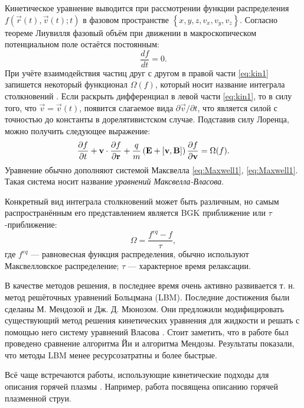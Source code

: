 Кинетическое уравнение выводится при рассмотрении функции распределения $f \left( \vec{r} (t), \vec{v} (t); t \right)$ в фазовом пространстве $\left\{ x,y,z,v_x,v_y,v_z \right\}$. Согласно теореме Лиувилля фазовый объём при движении в макроскопическом потенциальном поле остаётся постоянным:
\begin{equation}
\frac{d f}{dt} = 0.
\label{eq:kin1}
\end{equation}
При учёте взаимодействия частиц друг с другом в правой части \eqref{eq:kin1} запишется некоторый функционал $\Omega (f)$, который носит название интеграла столкновений \cite{chang1992unified}. Если раскрыть дифференциал в левой части \eqref{eq:kin1}, то в силу того, что $\vec{v} = \vec{v}(t)$, появится слагаемое вида $\partial \vec{v} / \partial t$, что является силой с точностью до константы в дорелятивистском случае. Подставив силу Лоренца, можно получить следующее выражение:
\begin{eqnarray}
\frac{\partial {f}}{\partial {t}} + \mathbf{v} \cdot \frac{\partial {f}}{\partial {\mathbf{r}}} + \frac{q}{m} \left( \mathbf{E} + \left[ \mathbf{{v}},\mathbf{{B}} \right] \right) \frac{\partial {f}}{\partial {\mathbf{v}}} = \Omega (f).
\label{eq:kinetic2}
\end{eqnarray}
Уравнение обычно дополняют системой Максвелла \eqref{eq:Maxwell1}, \eqref{eq:Maxwell1}. Такая система носит название \textit{уравнений Максвелла-Власова}.

Конкретный вид интеграла столкновений может быть различным, но самым распространённым его представлением является BGK приближение или $\tau$-приближение:
\begin{equation}
\Omega = \frac{f^{eq} - f}{\tau},
\label{eq:BGK}
\end{equation}
где $f^{eq}$ --- равновесная функция распределения, обычно используют Максвелловское распределение; $\tau$ --- характерное время релаксации.

В качестве методов решения, в последнее время очень активно развивается т. н. метод решёточных уравнений Больцмана (LBM). Последние достижения были сделаны М. Мендозой и Дж. Д. Мюнозом. Они предложили модифицировать существующий метод решения кинетических уравнения для жидкости и решать с помощью него систему уравнений Власова \cite{Mendoza2010,Romatschke2011,Mendoza2011,Mendoza2008,Hupp2011}. Стоит заметить, что в работе \cite{Mendoza2010} был проведено сравнение алгоритма Йи и алгоритма Мендозы. Результаты показали, что методы LBM менее ресурсозатратны и более быстрые.

Всё чаще встречаются работы, использующие кинетические подходы для описания горячей плазмы \cite{Pattison2008}. Например, работа \cite{Zhang2007} посвящена описанию горячей плазменной струи.


